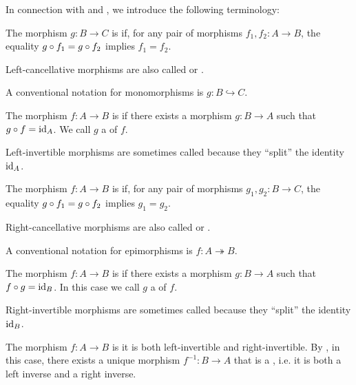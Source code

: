 \begin{definition}\label{def:morphism_invertibility}
  In connection with  and , we introduce the following terminology:
  \begin{thmenum}
     The morphism \( g: B \to C \) is  if, for any pair of morphisms \( f_1, f_2: A \to B \), the equality \( g \mathbin \circ f_1 = g \mathbin \circ f_2 \) implies \( f_1 = f_2 \).

    Left-cancellative morphisms are also called  or .

    A conventional notation for monomorphisms is \( g: B \hookrightarrow C \).

     The morphism \( f: A \to B \) is  if there exists a morphism \( g: B \to A \) such that \( g \mathbin \circ f = \operatorname{id}_A \). We call \( g \) a  of \( f \).

    Left-invertible morphisms are sometimes called  because they \enquote{split} the identity \( \operatorname{id}_A \).

     The morphism \( f: A \to B \) is  if, for any pair of morphisms \( g_1, g_2: B \to C \), the equality \( g \mathbin \circ f_1 = g \mathbin \circ f_2 \) implies \( g_1 = g_2 \).

    Right-cancellative morphisms are also called  or .

    A conventional notation for epimorphisms is \( f: A \twoheadrightarrow B \).

     The morphism \( f: A \to B \) is  if there exists a morphism \( g: B \to A \) such that \( f \mathbin \circ g = \operatorname{id}_B \). In this case we call \( g \) a  of \( f \).

    Right-invertible morphisms are sometimes called  because they \enquote{split} the identity \( \operatorname{id}_B \).

     The morphism \( f: A \to B \) is  it is both left-invertible and right-invertible. By , in this case, there exists a unique morphism \( f^{-1}: B \to A \) that is a , i.e. it is both a left inverse and a right inverse.


\end{thmenum}
\end{definition}
